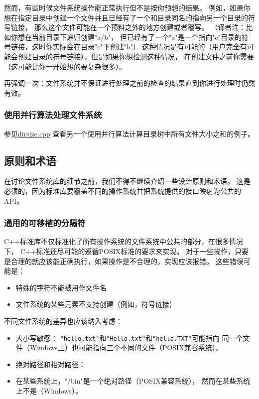然而，有些时候文件系统操作能正常执行但不是按你预想的结果。
例如，如果你想在指定目录中创建一个文件并且已经有了一个和目录同名的指向另一个目录的符号链接，
那么这个文件可能在一个预料之外的地方创建或者覆写。
（译者注：比如你想在当前目录下递归创建"a/b"，
但已经有了一个"a"是一个指向"c"目录的符号链接，这时你实际会在目录"c"下创建"b"）
这种情况是有可能的（用户完全有可能会创建目录的符号链接），但是如果你想检测这种情况，
在创建文件之前你需要（这可能比你一开始想的要复杂很多）。

再强调一次：文件系统并不保证进行处理之前的检查的结果直到你进行处理时仍然有效。

\subsubsection{使用并行算法处理文件系统}
参见\hyperref[ch22.6.1.4]{dirsize.cpp}
查看另一个使用并行算法计算目录树中所有文件大小之和的例子。

\subsection{原则和术语}
在讨论文件系统库的细节之前，我们不得不继续介绍一些设计原则和术语。
这是必须的，因为标准库要覆盖不同的操作系统并把系统提供的接口映射为公共的API。

\subsubsection{通用的可移植的分隔符}
C++标准库不仅标准化了所有操作系统的文件系统中公共的部分，在很多情况下，
C++标准还尽可能的遵循POSIX标准的要求来实现。
对于一些操作，只要是合理的就应该能正确执行，如果操作是不合理的，实现应该报错。
这些错误可能是：
\begin{itemize}[leftmargin=*]
    \item 特殊的字符不能被用作文件名
    \item 文件系统的某些元素不支持创建（例如，符号链接）
\end{itemize}
不同文件系统的差异也应该纳入考虑：
\begin{itemize}[leftmargin=*]
    \item 大小写敏感：
    \texttt{"hello.txt"}和\texttt{"Hello.txt"}和\texttt{"hello.TXT"}可能指向
    同一个文件（Windows上）也可能指向三个不同的文件（POSIX兼容系统）。
    \item 绝对路径和相对路径：
    \item 在某些系统上，"/bin"是一个绝对路径（POSIX兼容系统），
    然而在某些系统上不是（Windows）。
\end{itemize}

